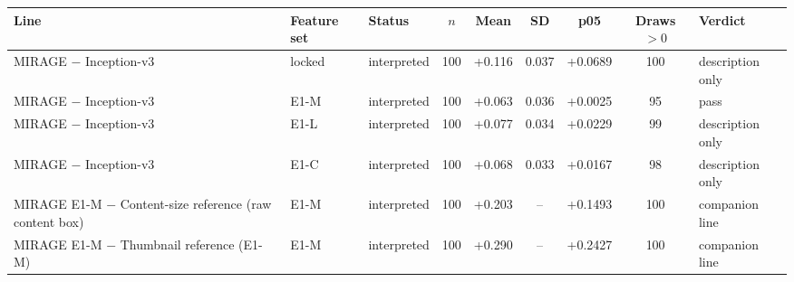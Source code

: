 \begin{tabular}{@{}p{4.4cm}lp{2.2cm}cccccl@{}}
\toprule
Line & Feature set & Status & $n$ & Mean & SD & p05 & Draws $>0$ & Verdict \\
\midrule
MIRAGE $-$ Inception-v3 & locked & interpreted & 100 & +0.116 & 0.037 & +0.0689 & 100 & description only \\
MIRAGE $-$ Inception-v3 & E1-M & interpreted & 100 & +0.063 & 0.036 & +0.0025 & 95 & pass \\
MIRAGE $-$ Inception-v3 & E1-L & interpreted & 100 & +0.077 & 0.034 & +0.0229 & 99 & description only \\
MIRAGE $-$ Inception-v3 & E1-C & interpreted & 100 & +0.068 & 0.033 & +0.0167 & 98 & description only \\
MIRAGE E1-M $-$ Content-size reference (raw content box) & E1-M & interpreted & 100 & +0.203 & -- & +0.1493 & 100 & companion line \\
MIRAGE E1-M $-$ Thumbnail reference (E1-M) & E1-M & interpreted & 100 & +0.290 & -- & +0.2427 & 100 & companion line \\
\bottomrule
\end{tabular}
